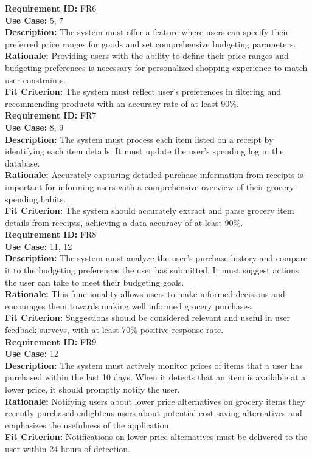 \documentclass[12pt]{article}
\begin{document}
\medskip
\noindent \textbf{Requirement ID:} FR6\\
\textbf{Use Case:} 5, 7\\
\textbf{Description:} The system must offer a feature where users can specify their preferred price ranges for goods and set comprehensive budgeting parameters.\\
\textbf{Rationale:} Providing users with the ability to define their price ranges and budgeting preferences is necessary for personalized shopping experience to match user constraints.\\
\textbf{Fit Criterion:} The system must reflect user's preferences in filtering and recommending products with an accuracy rate of at least 90\%.\\

\medskip
\noindent \textbf{Requirement ID:} FR7\\
\textbf{Use Case:} 8, 9\\
\textbf{Description:} The system must process each item listed on a receipt by identifying each item details. It must update the user's spending log in the database.\\
\textbf{Rationale:} Accurately capturing detailed purchase information from receipts is important for informing users with a comprehensive overview of their grocery spending habits.\\
\textbf{Fit Criterion:} The system should accurately extract and parse grocery item details from receipts, achieving a data accuracy of at least 90\%.\\

\medskip
\noindent \textbf{Requirement ID:} FR8\\
\textbf{Use Case:} 11, 12\\
\textbf{Description:} The system must analyze the user's purchase history and compare it to the budgeting preferences the user has submitted. It must suggest actions the user can take to meet their budgeting goals.\\
\textbf{Rationale:} This functionality allows users to make informed decisions and encourages them towards making well informed grocery purchases.\\
\textbf{Fit Criterion:} Suggestions should be considered relevant and useful in user feedback surveys, with at least 70\% positive response rate.\\

\medskip
\noindent \textbf{Requirement ID:} FR9\\
\textbf{Use Case:} 12\\
\textbf{Description:} The system must actively monitor prices of items that a user has purchased within the last 10 days. When it detects that an item is available at a lower price, it should promptly notify the user.\\
\textbf{Rationale:} Notifying users about lower price alternatives on grocery items they recently purchased enlightens users about potential cost saving alternatives and emphasizes the usefulness of the application.\\
\textbf{Fit Criterion:} Notifications on lower price alternatives must be delivered to the user within 24 hours of detection.\\
\end{document}
